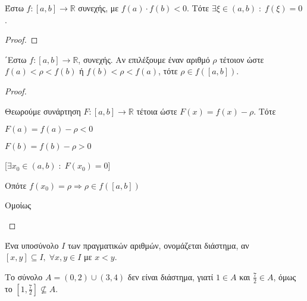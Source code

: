 \begin{thm}[Bolzano]
  Έστω $ f \colon [a,b] \to \mathbb{R} $ συνεχής, με $ f(a) \cdot f(b) <0 $. 
  Τότε $ \exists \xi \in (a,b) \; : \; f(\xi) = 0 $.
\end{thm}

\begin{proof}
\end{proof}

\begin{thm}
  ΄Εστω $ f \colon [a,b] \to \mathbb{R} $, συνεχής. Αν επιλέξουμε έναν αριθμό 
  $ \rho $ τέτοιον ώστε $ f(a) < \rho < f(b) $ ή $ f(b) < \rho < f(a) $, τότε 
  $ \rho \in f([a,b]) $.
\end{thm}

\begin{proof}
\item {}
  \begin{description}
    \item [1η Περίπτωση: $(f(a)< \rho < f(b))$]
    \item {}
      Θεωρούμε συνάρτηση $ F \colon [a,b] \to \mathbb{R} $ τέτοια ώστε $ 
      F(x) = f(x) - \rho$. Τότε 

      \begin{minipage}{0.3\textwidth}
        \begin{myitemize}
          \item $F(a) = f(a) - \rho < 0 $ \hfill {}
          \item $F(b) = f(b) - \rho >0 $ \hfill  {}
        \end{myitemize}
      \end{minipage}
      [$ \exists x_{0} \in (a,b) \; : \; F(x_{0}) = 0 $]

      Οπότε 
      $ 
      f(x_{0}) = \rho \Rightarrow \rho \in f([a,b])
      $

    \item [2η Περίπτωση: $(f(b)< \rho < f(a))$]
    \item {}
      Ομοίως
  \end{description}
\end{proof}

\begin{dfn}
  Ένα υποσύνολο $I$ των πραγματικών αριθμών, ονομάζεται διάστημα, αν 
  $ [x,y] \subseteq I, \; \forall x,y \in I $ με $ x<y $.
\end{dfn}

\begin{example}
  Το σύνολο $ A = (0,2) \cup (3,4) $ δεν είναι διάστημα, γιατί $ 1 \in A $ και 
  $ \frac{7}{2} \in A $, όμως το $ \left[1, \frac{7}{2}\right] \not\subseteq A $.
\end{example}

